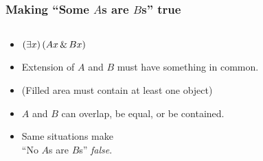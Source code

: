 \begin{frame}
\frametitle{Making ``Some $A$s are $B$s'' true}

\begin{columns}
  \begin{column}{.5\textwidth}


    \begin{itemize}
      \item $(\exists x)\,(Ax \,\&\, Bx)$
      \item Extension of $A$ and $B$ must have something in common.
      \item[] (Filled area must contain at least one object)
      \item $A$ and $B$ can \alert<1>{overlap}, \alert<2>{be equal}, or \alert<3->{be contained}.
      \item Same situations make \\ ``No $A$s are $B$s'' \emph{false}.
    \end{itemize}
 \end{column}
  
 
  

\end{columns}
\end{frame}
